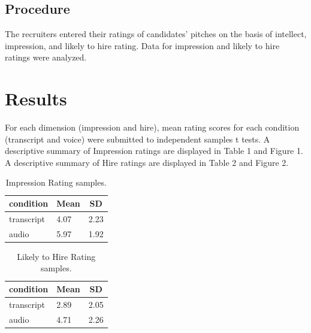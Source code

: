 \documentclass[
  english,
  man]{apa6}
\begin{document}
\hypertarget{procedure}{%
\subsection{Procedure}\label{procedure}}

The recruiters entered their ratings of candidates' pitches on the basis of intellect, impression, and likely to hire rating. Data for impression and likely to hire ratings were analyzed.

\hypertarget{results}{%
\section{Results}\label{results}}

For each dimension (impression and hire), mean rating scores for each condition (transcript and voice) were submitted to independent samples t tests. A descriptive summary of Impression ratings are displayed in Table 1 and Figure 1. A descriptive summary of Hire ratings are displayed in Table 2 and Figure 2.

\begin{table}[tbp]

\begin{center}
\begin{threeparttable}

\caption{\label{tab:unnamed-chunk-2}Impression Rating samples.}

\begin{tabular}{lll}
\toprule
condition & \multicolumn{1}{c}{Mean} & \multicolumn{1}{c}{SD}\\
\midrule
transcript & 4.07 & 2.23\\
audio & 5.97 & 1.92\\
\bottomrule
\end{tabular}

\end{threeparttable}
\end{center}

\end{table}

\begin{table}[tbp]

\begin{center}
\begin{threeparttable}

\caption{\label{tab:unnamed-chunk-2}Likely to Hire Rating samples.}

\begin{tabular}{lll}
\toprule
condition & \multicolumn{1}{c}{Mean} & \multicolumn{1}{c}{SD}\\
\midrule
transcript & 2.89 & 2.05\\
audio & 4.71 & 2.26\\
\bottomrule
\end{tabular}

\end{threeparttable}
\end{center}

\end{table}
\end{document}
